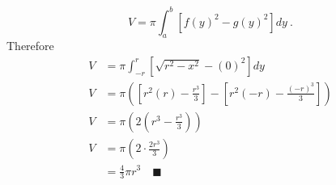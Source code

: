 \documentclass{article}
\begin{document}
\begin{equation}
	V = \pi \int_a^b \left[f(y)^2 - g(y)^2 \right] dy\ .
\end{equation}
Therefore
\begin{align*}
	V &= \pi \int_{-r}^r \left[ \sqrt{r^2 - x^2}  - (0)^2\right] dy \\
	V &= \pi \left( \left[ r^2(r) - \frac{r^3}{3} \right] - \left[ r^2(-r) - \frac{(-r)^3}{3} \right] \right) \\
	V &= \pi \left( 2 \left( r^3 - \frac{r^3}{3} \right) \right) \\
	V &= \pi \left( 2 \cdot \frac{2r^3}{3} \right) \\
	  &= \frac{4}{3} \pi r^3 \quad \blacksquare
\end{align*}
\end{document}
